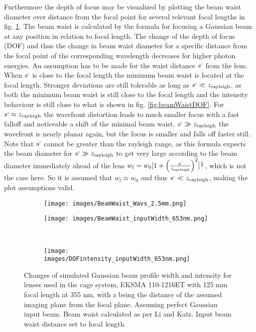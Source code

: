 \documentclass[twoside,openright,listof=numbered]{scrreprt}
\begin{document}
Furthermore the depth of focus may be visualized by plotting the beam waist diameter over distance from the focal point for several relevant focal lengths in fig. \ref{fig:beamWaistCompendium}. The beam waist is calculated by the formula for focusing a Gaussian beam at any position in relation to focal length. The change of the depth of focus (DOF) and thus the change in beam waist diameter for a specific distance from the focal point of the corresponding wavelength decreases for higher photon energies. An assumption has to be made for the waist distance $s^\shortmid$ from the lens. When $s^\shortmid$ is close to the focal length the minimum beam waist is located at the focal length. Stronger deviations are still tolerable as long as $s^\shortmid \ll z_\text{rayleigh}$, as both the minimum beam waist is still close to the focal length and the intensity behaviour is still close to what is shown in fig. \ref{fig:beamWaistDOF}. For $s^\shortmid \approx z_\text{rayleigh}$ the wavefront distortion leads to much smaller focus with a fast falloff and noticeable a shift of the minimal beam waist. $s^\shortmid \gg z_\text{rayleigh}$ the wavefront is nearly planar again, but the focus is smaller and falls off faster still. Note that $s^\shortmid$ cannot be greater than the rayleigh range, as this formula expects the beam diameter for $s^\shortmid \gg z_\text{rayleigh}$ to get very large according to the beam diameter immediately ahead of the lens $w_l = w_0 [1+\left(\frac{s^\shortmid}{z_\text{rayleigh}}\right)^2]^\frac{1}{2}$, which is not the case here. So it is assumed that $w_l \approx w_0$ and thus $s^\shortmid \ll z_\text{rayleigh}$, making the plot assumptions valid.\cite{Li1994}

\begin{figure}[htbp]
\centering
\begin{subfigure}[t]{0.49\textwidth}
\centering
\texttt{[image: images/BeamWaist\_Wavs\_2.5mm.png]} 
\end{subfigure}
\hfill
\begin{subfigure}[t]{0.49\textwidth}
\centering
\texttt{[image: images/BeamWaist\_inputWidth\_653nm.png]} 
\end{subfigure}
\hfill
\\
\centering
\begin{subfigure}[t]{\textwidth}
\texttt{[image: images/DOFintensity\_inputWidth\_653nm.png]} 
\end{subfigure}
\caption[Changes of simulated Gaussian beam profile width and intensity for lenses used in the cage system.]{Changes of simulated Gaussian beam profile width and intensity for lenses used in the cage system, EKSMA 110-1216ET with 125 mm focal length at 355 nm, with z being the distance of the assumed imaging plane from the focal plane.  Assuming perfect Gaussian input beam. Beam waist calculated as per Li and Katz\cite{Li1994}. Input beam waist distance set to focal length. \label{fig:beamWaistCompendium}}
\end{figure}
\end{document}
